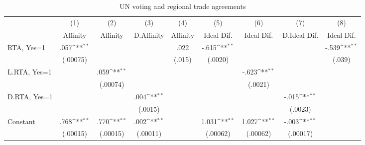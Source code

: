 \begin{table} \footnotesize \begin{threeparttable} \caption{UN voting and regional trade agreements}         \label{table:affinity} \centering       {}         \begin{tabular}{l*{8}{c}} \toprule \toprule
                    &\multicolumn{1}{c}{(1)}        &\multicolumn{1}{c}{(2)}        &\multicolumn{1}{c}{(3)}        &\multicolumn{1}{c}{(4)}        &\multicolumn{1}{c}{(5)}        &\multicolumn{1}{c}{(6)}        &\multicolumn{1}{c}{(7)}        &\multicolumn{1}{c}{(8)}        \\
                    &    Affinity        &    Affinity        &  D.Affinity        &    Affinity        &  Ideal Dif.        &  Ideal Dif.        &D.Ideal Dif.        &  Ideal Dif.        \\
\midrule 
RTA, Yes=1          &        .057\sym{**}&                    &                    &        .022        &       -.615\sym{**}&                    &                    &       -.539\sym{**}\\
                    &    (.00075)        &                    &                    &      (.015)        &     (.0020)        &                    &                    &      (.039)        \\
L.RTA, Yes=1        &                    &        .059\sym{**}&                    &                    &                    &       -.623\sym{**}&                    &                    \\
                    &                    &    (.00074)        &                    &                    &                    &     (.0021)        &                    &                    \\
D.RTA, Yes=1        &                    &                    &        .004\sym{**}&                    &                    &                    &       -.015\sym{**}&                    \\
                    &                    &                    &     (.0015)        &                    &                    &                    &     (.0023)        &                    \\
Constant            &        .768\sym{**}&        .770\sym{**}&        .002\sym{**}&                    &       1.031\sym{**}&       1.027\sym{**}&       -.003\sym{**}&                    \\
                    &    (.00015)        &    (.00015)        &    (.00011)        &                    &    (.00062)        &    (.00062)        &    (.00017)        &                    \\

\end{tabular}
\end{threeparttable}
\end{table}
